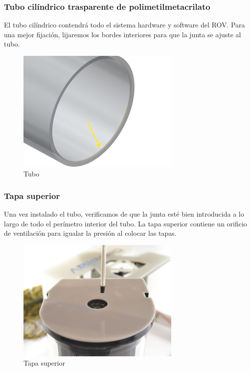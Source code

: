 \subsubsection{Tubo cilíndrico trasparente de polimetilmetacrilato}
\label{subsubsec:tubo}
El tubo cilíndrico contendrá todo el sistema hardware y software del ROV.
Para una mejor fijación, lijaremos los bordes interiores para que la junta se ajuste al tubo.
\begin{figure} [hbtp]
\begin{center}
  \includegraphics[width=8cm]{img/cap3/3_4/tubo}
\end{center}
\caption{Tubo}
\label{fig:tubo}
\end{figure}

\subsubsection{Tapa superior}
\label{subsubsec:tapa}
Una vez instalado el tubo, verificamos de que la junta esté bien introducida a lo largo de todo el perímetro interior del tubo.
La tapa superior contiene un orificio de ventilación para igualar la presión al colocar las tapas.
\begin{figure} [hbtp]
\begin{center}
  \includegraphics[width=8cm]{img/cap3/3_4/tapa_superior}
\end{center}
\caption{Tapa superior}
\label{fig:tapa_sup}
\end{figure}  

